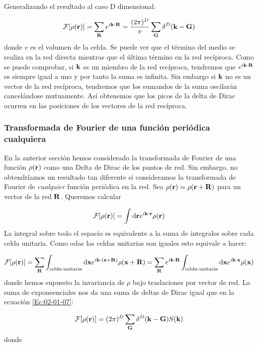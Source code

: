 Generalizando el resultado al caso D dimensional:

\begin{equation}
	\mathcal{F} [\rho(\mathbf{r})] = \sum_{\mathbf{R}} e^{i\mathbf{k} \cdot \mathbf{R}} = \frac{(2\pi)^D}{v} \sum_{\mathbf{G}} \delta^D (\mathbf{k}-\mathbf{G}) \label{Ec:02-01-07}
\end{equation}
donde $v$ es el volumen de la celda. Se puede ver que el término del medio se realiza en la red directa mientras que el último término en la red recíproca. Como se puede comprobar, si $\mathbf{k}$ es un miembro de la red recíproca, tendremos que $e^{i \mathbf{k} \cdot \mathbf{R}}$ es siempre igual a uno y por tanto la suma es infinita. Sin embargo si $\mathbf{k}$ no es un vector de la red recíproca, tendremos que los sumandos de la suma oscilarán cancelándose mutuamente. Así obtenemos que los picos de la delta de Dirac ocurren en las posiciones de los vectores de la red recíproca.

\subsubsection{Transformada de Fourier de una función periódica cualquiera}

En la anterior sección hemos considerado la transformada de Fourier de una función $\rho(\mathbf{r})$ como una Delta de Dirac de los puntos de red. Sin embargo, no obtendríamos un resultado tan diferente si consideramos la transformada de Fourier de \textit{cualquier} función periódica en la red. Sea $\rho(\mathbf{r})=\rho(\mathbf{r}+\mathbf{R})$ para un vector de la red $\mathbf{R}$. Queremos calcular 

\begin{equation}
	\mathcal{F} [\rho(\mathbf{r})] = \int \mathrm{d} \mathbf{r} e^{i \mathbf{k} \cdot \mathbf{r}} \rho (\mathbf{r})
\end{equation}	
La integral sobre todo el espacio es equivalente a la suma de integrales sobre cada celda unitaria. Como odas las celdas unitarias son iguales esto equivale a hacer:

\begin{equation}
	\mathcal{F} [\rho(\mathbf{r})] = \sum_{\mathbf{R}}\int_{\text{celda-unitaria}} \mathrm{d} \mathbf{x} e^{i \mathbf{k} \cdot (\mathbf{x} + \mathbf{R})} \rho (\mathbf{x} + \mathbf{R})  = \sum_{\mathbf{R}} e^{i \mathbf{k} \cdot \mathbf{R}} \int_{\text{celda-unitaria}} \mathrm{d} \mathbf{x} e^{i \mathbf{k} \cdot \mathbf{x}} \rho (\mathbf{x})
\end{equation}
donde hemos supuesto la invariancia de $\rho$ bajo traslaciones por vector de red. La suma de exponeenciales nos da una suma de deltas de Dirac igual que en la ecuación  \ref{Ec:02-01-07}:

\begin{equation}
	\mathcal{F} [\rho(\mathbf{r})] = (2\pi)^D \sum_{\mathbf{G}} \delta^D (\mathbf{k} - \mathbf{G}) S(\mathbf{k})
\end{equation}
donde 

